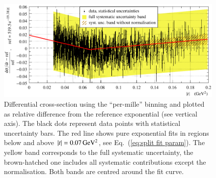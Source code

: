 \begin{figure}
\begin{center}
\includegraphics{fig/t_dist_rel_with_split_fit.pdf}
\vskip-4mm
\caption{%
Differential cross-section using the ``per-mille'' binning and plotted as relative difference from the reference exponential (see vertical axis). The black dots represent data points with statistical uncertainty bars. The red line shows pure exponential fits in regions below and above $|t| = 0.07\,{\rm GeV^2}$, see Eq.~(\ref{eq:split fit param}). The yellow band corresponds to the full systematic uncertainty, the brown-hatched one includes all systematic contributions except the normalisation. Both bands are centred around the fit curve.
}
\label{fig:data rel cpb0.001}
\end{center}
\end{figure}

